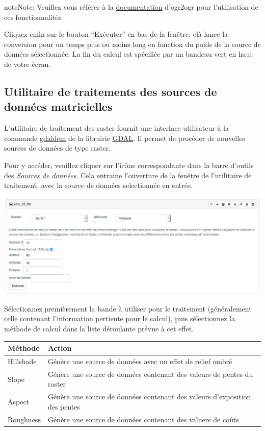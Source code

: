\documentclass[letterpaper,10pt,french]{sphinxmanual}
\begin{document}
\begin{notice}{note}{Note:}
Veuillez vous référer à la \href{http://www.gdal.org/ogr2ogr.html}{documentation} d'ogr2ogr pour l'utilisation de ces fonctionnalités
\end{notice}

Cliquez enfin sur le bouton ``Exécuter'' en bas de la fenêtre. elà lance la conversion pour un temps plus ou moins long en fonction du poids de la source de données sélectionnée. La fin du calcul est spécifiée par un bandeau vert en haut de votre écran.


\subsection{Utilitaire de traitements des sources de données matricielles}
\label{data/processing:utilitaire-de-traitements-des-sources-de-donnees-matricielles}
L'utilitaire de traitement des raster fournit une interface utilisateur à la commande \href{http://www.gdal.org/gdaldem.html}{gdaldem} de la librairie \href{http://www.gdal.org}{GDAL}. Il permet de procéder de nouvelles sources de données de type raster.

Pour y accéder, veuillez cliquer sur l'icône correspondante dans la barre d'outils des {\hyperref[data/datasources::doc]{\emph{\emph{Sources de données}}}}. Cela entraine l'ouverture de la fenêtre de l'utilitaire de traitement, avec la source de données selectionnée en entrée.

\includegraphics[width=1.000\linewidth]{process-raster-window.png}

Sélectionnez premièrement la bande à utiliser pour le traitement (généralement celle contenant l'information pertiente pour le calcul), puis sélectionnez la méthode de calcul dans la liste déroulante prévue à cet effet.

\begin{tabulary}{\linewidth}{|L|L|}
\hline

\textbf{Méthode}
 & 
\textbf{Action}
\\
\hline
Hillshade
 & 
Génère une source de données avec un effet de relief ombré
\\
\hline
Slope
 & 
Génère une source de données contenant des valeurs de pentes du raster
\\
\hline
Aspect
 & 
Génère une source de données contenant des valeurs d'exposition des pentes
\\
\hline
Roughness
 & 
Génère une source de données contenant des valuers de coûts
\\
\hline\end{tabulary}
\end{document}
